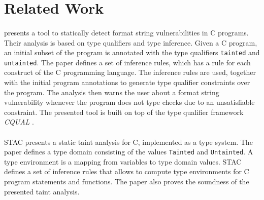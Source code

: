 \section{Related Work}

\paragraph{\cite{Shankar:2001:DFS}} presents a tool to statically
detect format string vulnerabilities in C programs. Their analysis
is based on type qualifiers and type inference. Given a C program,
an initial subset of the program is annotated with the type qualifiers
\texttt{tainted} and \texttt{untainted}. The paper defines a set
of inference rules, which has a rule for each construct of
the C programming language. The inference rules are used, together
with the initial program annotations to generate type qualifier
constraints over the program. The analysis then warns the user
about a format string vulnerability whenever the program does not
type checks due to an unsatisfiable constraint. The presented tool
is built on top of the type qualifier framework \textit{CQUAL} 
\cite{Foster:pldi99}.

\paragraph{\cite{Dimitru:2009:STAC}} STAC presents a static taint
analysis for C, implemented as a type system. The paper defines a type
domain consisting of the values \texttt{Tainted} and \texttt{Untainted}.
A type environment is a mapping from variables to type domain values.
STAC defines a set of inference rules that allows to compute
type environments for C program statements and functions. The paper
also proves the soundness of the presented taint analysis.


